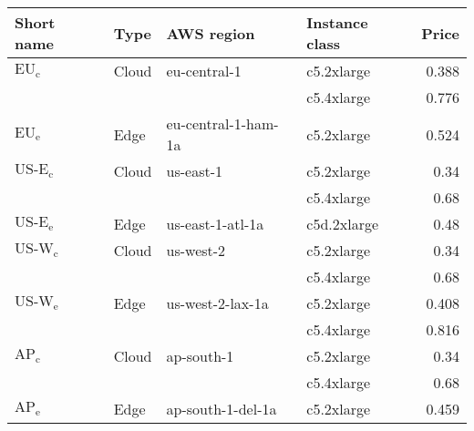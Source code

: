 \begin{tabular}{llllr}
\toprule
Short name & Type & AWS region & Instance class & Price \\
\midrule
$\text{EU}_\text{c}$ & Cloud & eu-central-1 &  c5.2xlarge &  0.388  \\
 &  &  &  c5.4xlarge &  0.776  \\
\midrule
$\text{EU}_\text{e}$ & Edge & eu-central-1-ham-1a &  c5.2xlarge &  0.524  \\
\midrule
$\text{US-E}_\text{c}$ & Cloud & us-east-1 &  c5.2xlarge &  0.34  \\
 &  &  &  c5.4xlarge &  0.68  \\
\midrule
$\text{US-E}_\text{e}$ & Edge & us-east-1-atl-1a &  c5d.2xlarge &  0.48  \\
\midrule
$\text{US-W}_\text{c}$ & Cloud & us-west-2 &  c5.2xlarge &  0.34  \\
 &  &  &  c5.4xlarge &  0.68  \\
\midrule
$\text{US-W}_\text{e}$ & Edge & us-west-2-lax-1a &  c5.2xlarge &  0.408  \\
 &  &  &  c5.4xlarge &  0.816  \\
\midrule
$\text{AP}_\text{c}$ & Cloud & ap-south-1 &  c5.2xlarge &  0.34  \\
 &  &  &  c5.4xlarge &  0.68  \\
\midrule
$\text{AP}_\text{e}$ & Edge & ap-south-1-del-1a &  c5.2xlarge &  0.459  \\
\bottomrule
\end{tabular}
